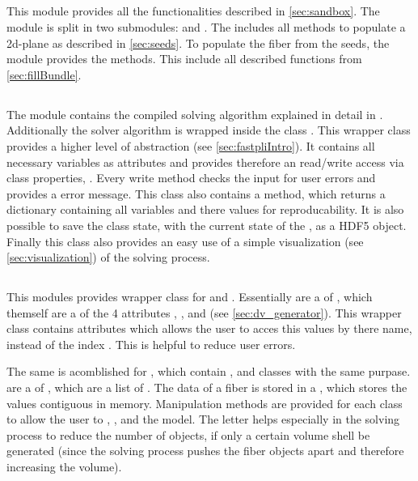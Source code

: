 \subsection{}
%
This module provides all the functionalities described in \cref{sec:sandbox}.
The module is split in two submodules:  and .
The  includes all methods to populate a 2d-plane as described in \cref{sec:seeds}.
To populate the fiber from the seeds, the module  provides the methods.
This include all described functions from \cref{sec:fillBundle}.
%
%
%
\subsection{}
%
The  module contains the compiled solving algorithm explained in detail in .
Additionally the solver algorithm is wrapped inside the class .
This wrapper class provides a higher level of abstraction (see \cref{sec:fastpliIntro}).
It contains all necessary variables as attributes and provides therefore an read/write access via class properties, \eg{} .
Every write method checks the input for user errors and provides a error message.
This class also contains a  method, which returns a \python{} dictionary containing all variables and there values for reproducability.
It is also possible to save the class state, with the current state of the , as a \ac{HDF5} object.
Finally this class also provides an easy use of a simple visualization (see \cref{sec:visualization}) of the solving process.
%
%
%
\subsection{}
%
This modules provides wrapper class for  and .
Essentially  are a  of , which themself are a  of the 4 attributes , ,  and  (see \cref{sec:dv_generator}).
This wrapper class contains attributes which allows the user to acces this values by there name, instead of the  index \code{[i]}.
This is helpful to reduce user errors.
\par
The same is acomblished for , which contain ,  and  classes with the same purpase.
 are a  of , which are a list of .
The data of a fiber is stored in a , which stores the values contiguous in memory.
Manipulation methods are provided for each class to allow the user to , ,  and  the model.
The letter helps especially in the solving process to reduce the number of objects, if only a certain volume shell be generated (since the solving process pushes the fiber objects apart and therefore increasing the volume).
%
%
%
